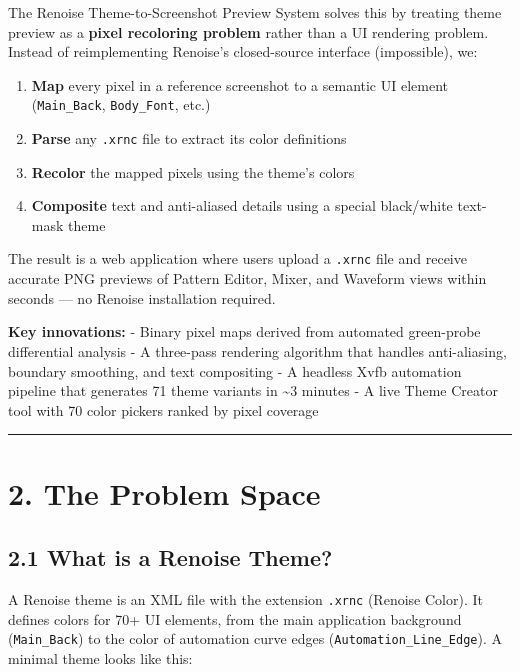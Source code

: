 \documentclass[
  11pt,
  oneside]{report}
\providecommand{\tightlist}{%
  \setlength{\itemsep}{0pt}\setlength{\parskip}{0pt}}
\begin{document}
The Renoise Theme-to-Screenshot Preview System solves this by treating
theme preview as a \textbf{pixel recoloring problem} rather than a UI
rendering problem. Instead of reimplementing Renoise's closed-source
interface (impossible), we:

\begin{enumerate}
\def\labelenumi{\arabic{enumi}.}
\tightlist
\item
  \textbf{Map} every pixel in a reference screenshot to a semantic UI
  element (\texttt{Main\_Back}, \texttt{Body\_Font}, etc.)
\item
  \textbf{Parse} any \texttt{.xrnc} file to extract its color
  definitions
\item
  \textbf{Recolor} the mapped pixels using the theme's colors
\item
  \textbf{Composite} text and anti-aliased details using a special
  black/white text-mask theme
\end{enumerate}

The result is a web application where users upload a \texttt{.xrnc} file
and receive accurate PNG previews of Pattern Editor, Mixer, and Waveform
views within seconds --- no Renoise installation required.

\textbf{Key innovations:} - Binary pixel maps derived from automated
green-probe differential analysis - A three-pass rendering algorithm
that handles anti-aliasing, boundary smoothing, and text compositing - A
headless Xvfb automation pipeline that generates 71 theme variants in
\textasciitilde3 minutes - A live Theme Creator tool with 70 color
pickers ranked by pixel coverage

\begin{center}\rule{0.5\linewidth}{0.5pt}\end{center}

\section{2. The Problem Space}\label{the-problem-space}

\subsection{2.1 What is a Renoise Theme?}\label{what-is-a-renoise-theme}

A Renoise theme is an XML file with the extension \texttt{.xrnc}
(Renoise Color). It defines colors for 70+ UI elements, from the main
application background (\texttt{Main\_Back}) to the color of automation
curve edges (\texttt{Automation\_Line\_Edge}). A minimal theme looks
like this:
\end{document}
